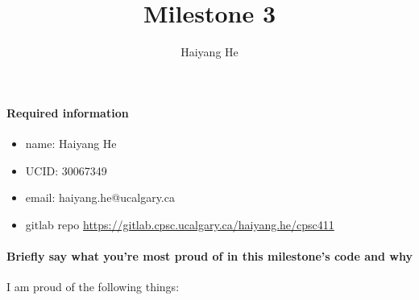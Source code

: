 \documentclass{article}
\author{Haiyang He}
\title{Milestone 3}
\begin{document}
\maketitle
\paragraph{Required information}
    \begin{itemize}
        \item name: Haiyang He
        \item UCID: 30067349
        \item email: haiyang.he@ucalgary.ca
        \item gitlab repo \url{https://gitlab.cpsc.ucalgary.ca/haiyang.he/cpsc411}
    \end{itemize}
\paragraph{Briefly say what you're most proud of in this milestone's code and why}
I am proud of the following things:
\end{document}
